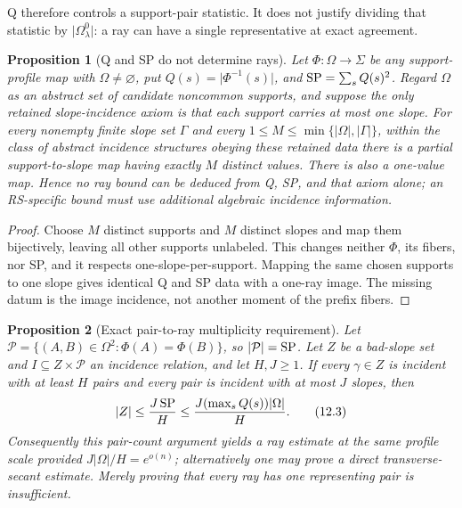 \documentclass[12pt,a4paper]{amsart}
\numberwithin{equation}{section}
\newtheorem{proposition}[proposition]{Proposition}
\theoremstyle{remark}
\newcommand{\abs}[1]{\lvert #1\rvert}
\begin{document}
Q therefore controls a support-pair statistic.  It does not justify dividing
that statistic by \(\abs{\Omega^0_\lambda}\): a ray can have a single
representative at exact agreement.

\begin{proposition}[Q and SP do not determine rays]
\label{prop:q-sp-no-ray}
Let \(\Phi:\Omega\to\Sigma\) be any support-profile map with
\(\Omega\ne\varnothing\), put
\(Q(s)=\abs{\Phi^{-1}(s)}\), and
\({\rm SP}=\sum_sQ(s)^2\).  Regard \(\Omega\) as an abstract set of
candidate noncommon supports, and suppose the only retained
slope-incidence axiom is that each support carries at most one slope.  For
every nonempty finite slope set \(\Gamma\) and every
\(1\le M\le\min\{\abs\Omega,\abs\Gamma\}\), within the class of abstract
incidence structures obeying these retained data there is a partial
support-to-slope map having exactly \(M\) distinct values.  There is also
a one-value map.  Hence no ray bound can be deduced from Q, SP, and that
axiom alone; an RS-specific bound must use additional algebraic incidence
information.
\end{proposition}

\begin{proof}
Choose \(M\) distinct supports and \(M\) distinct slopes and map them
bijectively, leaving all other supports unlabeled.  This changes neither
\(\Phi\), its fibers, nor SP, and it respects one-slope-per-support.
Mapping the same chosen supports to one slope gives identical Q and SP
data with a one-ray image.  The missing datum is the image incidence, not
another moment of the prefix fibers.
\end{proof}

\begin{proposition}[Exact pair-to-ray multiplicity requirement]
\label{prop:pair-ray-multiplicity}
Let
\(\mathcal P=\{(A,B)\in\Omega^2:\Phi(A)=\Phi(B)\}\), so
\(\abs{\mathcal P}={\rm SP}\).  Let \(Z\) be a bad-slope set and
\(I\subseteq Z\times\mathcal P\) an incidence relation, and let
\(H,J\ge1\).  If every
\(\gamma\in Z\) is incident with at least \(H\) pairs and every pair is
incident with at most \(J\) slopes, then
\[
 \abs Z\le\frac{J\,{\rm SP}}H
       \le\frac{J(\max_sQ(s))\abs\Omega}{H}.
 \tag{12.3}\label{eq:pair-ray-multiplicity}
\]
Consequently this pair-count argument yields a ray estimate at the same
profile scale provided \(J\abs\Omega/H=e^{o(n)}\); alternatively one may
prove a direct transverse-secant estimate.  Merely proving that every ray
has one representing pair is insufficient.
\end{proposition}
\end{document}
